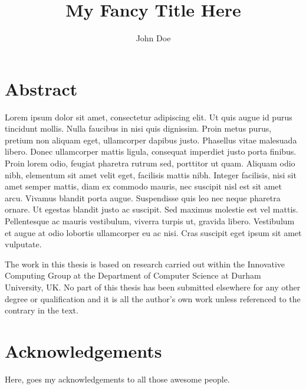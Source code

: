 \documentclass[final]{durthesis}
\title{My Fancy Title Here}
\author{John Doe}
\begin{document}
\frontmatter
\maketitle

\rhead{\thepage}
\lhead{}

\chapter*{Abstract}

Lorem ipsum dolor sit amet, consectetur adipiscing elit. Ut quis augue id purus tincidunt mollis. Nulla faucibus in nisi quis dignissim. Proin metus purus, pretium non aliquam eget, ullamcorper dapibus justo. Phasellus vitae malesuada libero. Donec ullamcorper mattis ligula, consequat imperdiet justo porta finibus. Proin lorem odio, feugiat pharetra rutrum sed, porttitor ut quam. Aliquam odio nibh, elementum sit amet velit eget, facilisis mattis nibh. Integer facilisis, nisi sit amet semper mattis, diam ex commodo mauris, nec suscipit nisl est sit amet arcu. Vivamus blandit porta augue. Suspendisse quis leo nec neque pharetra ornare. Ut egestas blandit justo ac suscipit. Sed maximus molestie est vel mattis. Pellentesque ac mauris vestibulum, viverra turpis ut, gravida libero. Vestibulum et augue at odio lobortis ullamcorper eu ac nisi. Cras suscipit eget ipsum sit amet vulputate.

\begin{declaration}
    The work in this thesis is based on research carried out within the Innovative Computing Group at the Department of Computer Science at Durham University, UK. No part of this thesis has been submitted elsewhere for any other degree or qualification and it is all the author's own work unless referenced to the contrary in the text.
\end{declaration}

\chapter*{Acknowledgements}

\vspace{-18pt}

Here, goes my acknowledgements to all those awesome people.

\tableofcontents
\listoffigures
\listoftables

\printglossary[type=\glsxtrabbrvtype,title={\numberline{}List of Acronyms}]

\mainmatter
\rhead{\thepage}
\lhead{\nouppercase{\textsc{\leftmark}}}



\clearpage
{}
{}



\appendix
\end{document}
